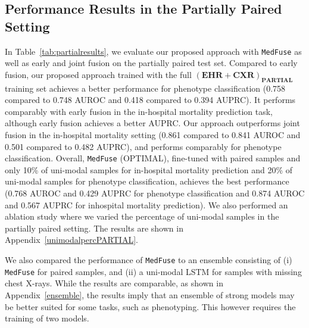 \documentclass[pmlr]{jmlr}
\begin{document}
\subsection{Performance Results in the Partially Paired Setting} 
In Table~\ref{tab:partialresults}, we evaluate our proposed approach with \texttt{MedFuse} as well as early and joint fusion on the partially paired test set. Compared to early fusion, our proposed approach trained with the full $(\mathbf{EHR}+\mathbf{CXR})_{\mathbf{PARTIAL}}$ training set achieves a better performance for phenotype classification (0.758 compared to 0.748 AUROC and 0.418 compared to 0.394 AUPRC). It performs comparably with early fusion in the in-hospital mortality prediction task, although early fusion achieves a better AUPRC. Our approach outperforms joint fusion in the in-hospital mortality setting (0.861 compared to 0.841 AUROC and 0.501 compared to 0.482 AUPRC), and performs comparably for phenotype classification. Overall, \texttt{MedFuse} (OPTIMAL), fine-tuned with paired samples and only 10\% of uni-modal samples for in-hospital mortality prediction and 20\% of uni-modal samples for phenotype classification, achieves the best performance (0.768 AUROC and 0.429 AUPRC for phenotype classification and 0.874 AUROC and 0.567 AUPRC for inhospital mortality prediction). We also performed an ablation study where we varied the percentage of uni-modal samples in the partially paired setting. The results are shown in Appendix~\ref{unimodalpercPARTIAL}.


We also compared the performance of \texttt{MedFuse} to an ensemble consisting of (i) \texttt{MedFuse} for paired samples, and (ii) a uni-modal LSTM for samples with missing chest X-rays. While the results are comparable, as shown in Appendix~\ref{ensemble}, the results imply that an ensemble of strong models may be better suited for some tasks, such as phenotyping. This however requires the training of two models. 
\end{document}
